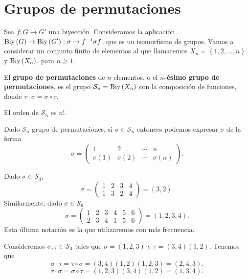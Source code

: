 \chapter{Grupos de permutaciones}
Sea $\displaystyle f : G \to G' $ una biyección. Consideramos la aplicación $\displaystyle \operatorname{Biy}\left(G\right) \to \operatorname{Biy}\left(G'\right) : \sigma \to f^{-1}\sigma f $, que es un isomorfismo de grupos.  
Vamos a considerar un conjunto finito de elementos al que llamaremos $\displaystyle X_{n} = \left\{ 1, 2, \ldots, n\right\}  $ y $\displaystyle \operatorname{Biy}\left(X_{n}\right) $, para $\displaystyle n \geq 1 $.
\begin{definition}
	El \textbf{grupo de permutaciones} de $\displaystyle n $ elementos, o el \textbf{$\displaystyle n $-ésimo grupo de permutaciones}, es el grupo $\displaystyle \mathcal{S}_{n} = \operatorname{Biy}\left(X_{n}\right) $ con la composición de funciones, donde $\displaystyle \tau \cdot \sigma = \sigma \circ \tau $. 
\end{definition}
\begin{observation}
El orden de $\displaystyle \mathcal{S}_{n} $ es $\displaystyle n! $. 
\end{observation}
\begin{notation}
Dado $\displaystyle \mathcal{S}_{n} $ grupo de permutaciones, si $\displaystyle \sigma \in \mathcal{S}_{n} $ entonces podemos expresar $\displaystyle \sigma  $ de la forma
\[\sigma = \begin{pmatrix} 1 & 2 & \cdots & n \\ \sigma\left(1\right) & \sigma\left(2\right) & \cdots & \sigma\left(n\right) \end{pmatrix} .\]
\end{notation}
\begin{eg}
Dado $\displaystyle \sigma \in \mathcal{S}_{4} $, 
\[\sigma = \begin{pmatrix} 1 & 2 & 3 & 4 \\ 1 & 3 & 2 & 4 \end{pmatrix}= \left(3,2\right) .\]
Similarmente, dado $\displaystyle \sigma \in \mathcal{S}_{6} $ 
\[\sigma = \begin{pmatrix} 1 & 2 & 3 & 4 & 5 & 6 \\ 2 & 3 & 4 & 1 & 5& 6 \end{pmatrix} = \left(1,2,3,4\right) .\]
Esta última notación es la que utilizaremos con más frecuencia.
\end{eg}
\begin{eg}
Consideremos $\displaystyle \sigma, \tau \in \mathcal{S}_{4} $ tales que $\displaystyle \sigma = \left(1,2,3\right) $ y $\displaystyle \tau = \left(3,4\right)\left(1,2\right) $. Tenemos que 
\[\sigma \cdot \tau = \tau \circ \sigma = \left(3,4\right)\left(1,2\right)\left(1,2,3\right) = \left(2,4,3\right) .\]
\[\tau \cdot \sigma = \sigma \circ \tau = \left(1,2,3\right)\left(3,4\right)\left(1,2\right) = \left(1,3,4\right) .\]
\end{eg}
